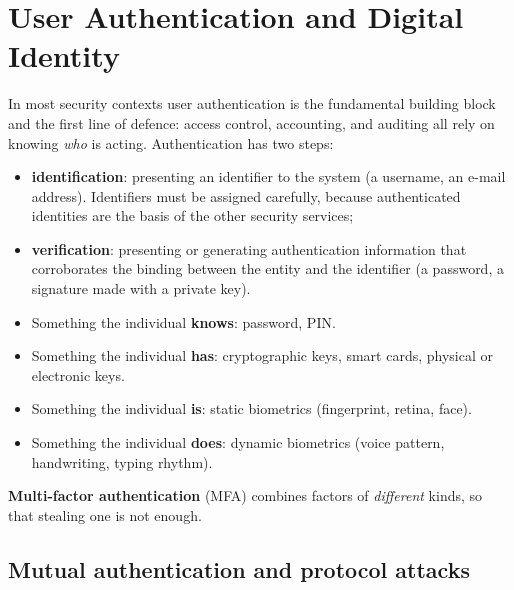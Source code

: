 \section{User Authentication and Digital Identity}
\label{sec:user-auth}

In most security contexts user authentication is the fundamental building block and the first line of defence: access control, accounting, and auditing all rely on knowing \emph{who} is acting. Authentication has two steps:
\begin{itemize}
    \item \textbf{identification}: presenting an identifier to the system (a username, an e-mail address). Identifiers must be assigned carefully, because authenticated identities are the basis of the other security services;
    \item \textbf{verification}: presenting or generating authentication information that corroborates the binding between the entity and the identifier (a password, a signature made with a private key).
\end{itemize}

\begin{definition}
\leavevmode
\begin{itemize}
    \item Something the individual \textbf{knows}: password, PIN.
    \item Something the individual \textbf{has}: cryptographic keys, smart cards, physical or electronic keys.
    \item Something the individual \textbf{is}: static biometrics (fingerprint, retina, face).
    \item Something the individual \textbf{does}: dynamic biometrics (voice pattern, handwriting, typing rhythm).
\end{itemize}
\textbf{Multi-factor authentication} (MFA) combines factors of \emph{different} kinds, so that stealing one is not enough.
\end{definition}

\subsection{Mutual authentication and protocol attacks}

